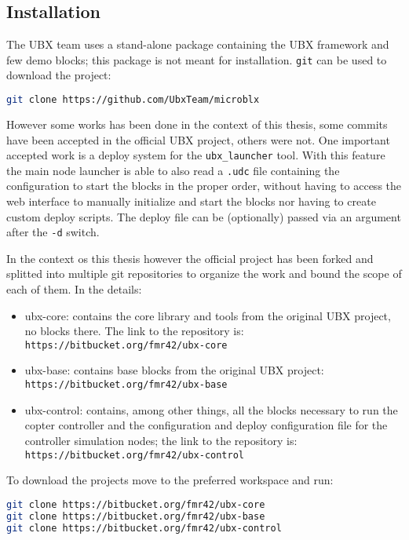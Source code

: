\subsection{Installation}
The UBX team uses a stand-alone package\autocite{bib:git:ubx} containing the UBX framework and few demo blocks; this package is not meant for installation. \texttt{git} can be used to download the project:
\begin{lstlisting}[language=bash]
git clone https://github.com/UbxTeam/microblx
\end{lstlisting}

However some works has been done in the context of this thesis, some commits have been accepted in the official UBX project, others were not. One important accepted work is a deploy system for the \texttt{ubx\_launcher} tool\autocite{bib:git:pullreq}. With this feature the main node launcher is able to also read a \texttt{.udc} file containing the configuration to start the blocks in the proper order, without having to access the web interface to manually initialize and start the blocks nor having to create custom deploy scripts.
The deploy file can be (optionally) passed via an argument after the \texttt{-d} switch.

In the context os this thesis however the official project has been forked and splitted into multiple git repositories to organize the work and bound the scope of each of them. In the details:
\begin{itemize}
	\item ubx-core: contains the core library and tools from the original UBX project, no blocks there. The link to the repository is:\\
	\texttt{https://bitbucket.org/fmr42/ubx-core}
	
	\item ubx-base: contains base blocks from the original UBX project:\\
	\texttt{https://bitbucket.org/fmr42/ubx-base}
	
	\item ubx-control: contains, among other things, all the blocks necessary to run the copter controller and the configuration and deploy configuration file for the controller simulation nodes; the link to the repository is:\\
	\texttt{https://bitbucket.org/fmr42/ubx-control}
\end{itemize}

To download the projects move to the preferred workspace and run:
\begin{lstlisting}[language=bash]
git clone https://bitbucket.org/fmr42/ubx-core
git clone https://bitbucket.org/fmr42/ubx-base
git clone https://bitbucket.org/fmr42/ubx-control
\end{lstlisting}

